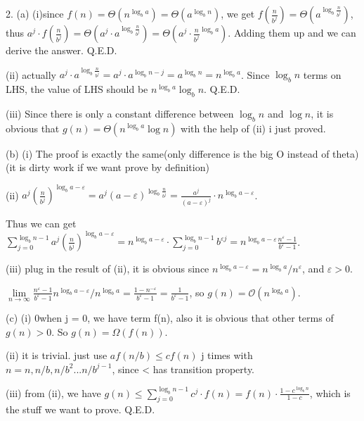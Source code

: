 \documentclass{article}
\begin{document}
\begin{itemize}
2. (a) (i)since $f(n)= \Theta\left(n^{\log _{b} a}\right) = \Theta\left(a^{\log _{b} n}\right)$, we get $f(\frac{n}{b^j})=\Theta\left(a^{\log _{b} \frac{n}{b^j}}\right)$, thus $a^j\cdot f(\frac{n}{b^j})=\Theta\left(a^j\cdot a^{\log _{b} \frac{n}{b^j}}\right) = \Theta\left(a^j\cdot \frac{n}{b^j}^{\log _{b} a}\right)$. 
Adding them up and we can derive the answer. Q.E.D.

(ii) actually $a^j\cdot a^{\log _{b} \frac{n}{b^j}} = a^j\cdot a^{\log _{b} n - j} =  a^{\log _{b} n} = n^{\log _{b} a}$. Since $\log _{b} n$ terms on LHS, the value of LHS should be $n^{\log _{b} a} \log _{b} n$. Q.E.D.

(iii) Since there is only a constant difference between $\log _{b} n$ and $\log n$, it is obvious that $g(n)=\Theta\left(n^{\log _{b} a} \log n\right)$ with the help of (ii) i just proved.

(b) (i) The proof is exactly the same(only difference is the big O instead of theta)(it is dirty work if we want prove by definition)

(ii) $a^{j}\left(\frac{n}{b^{j}}\right)^{\log _{b} a-\varepsilon} = a^{j}\left(a-\varepsilon \right)^{\log _{b} \frac{n}{b^{j}}} = \frac{a^j}{(a-\varepsilon)^j} \cdot n^{\log _{b} a-\varepsilon}$.

Thus we can get $\sum_{j=0}^{\log _{b}{n} -1} a^{j}\left(\frac{n}{b^{j}}\right)^{\log _{b} a-\varepsilon} = n^{\log _{b} a-\varepsilon}\cdot \sum_{j=0}^{\log _{b} n-1} b^{\varepsilon j} = n^{\log _{b} a-\varepsilon} \frac{n^{\varepsilon}-1}{b^{\varepsilon}-1}$.

(iii) plug in the result of (ii), it is obvious since $n^{\log _{b} a-\varepsilon} = n^{\log _{b} a}/{n^\varepsilon}$, and $\varepsilon > 0$. 

$\lim \limits_{n\to \infty} \frac{n^{\varepsilon}-1}{b^{\varepsilon}-1} n^{\log _{b} a-\varepsilon}/ n^{\log _{b} a} = \frac{1- n^{-\varepsilon}}{b^{\varepsilon}-1} = \frac{1}{b^\varepsilon - 1}$, so $g(n)=\mathcal{O}\left(n^{\log _{b} a}\right)$.

(c) (i) 0when j = 0, we have term f(n), also it is obvious that other terms of $g(n) > 0$. So $g(n)=\Omega(f(n))$.

(ii) it is trivial. just use $a f(n / b) \leq c f(n)$ j times with $n = n, n/b, n/b^2 ... n/b^{j-1}$, since < has transition property.

(iii) from (ii), we have $g(n)\leq \sum_{j=0}^{\log _{b} n-1} c^j\cdot f(n) = f(n)\cdot \frac{1-c^{\log_b n}}{1-c}$, which is the stuff we want to prove. Q.E.D.


\end{itemize}
\end{document}
